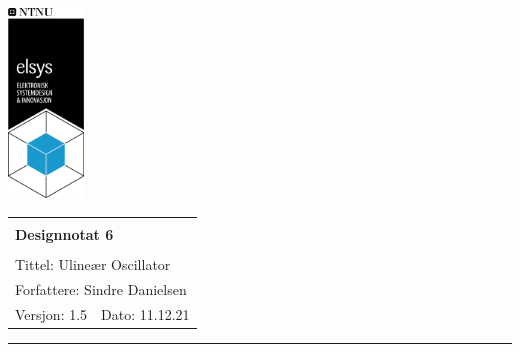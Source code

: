 \documentclass[a4paper,11pt,norsk]{article}
\begin{document}
\begin{minipage}[c]{0.15\textwidth}
\includegraphics[width=2.0cm]{elsys_pos_staaende_ntnu.png}
\end{minipage}
\begin{minipage}[c]{0.85\textwidth}

\renewcommand{\arraystretch}{1.7}
\large 
\begin{tabularx}{\textwidth}{|X|X|}
\hline
\multicolumn{2}{|l|}{} \\
\multicolumn{2}{|l|}{\huge \textbf{Designnotat 6}} \\
\multicolumn{2}{|l|}{}  \\
\hline
\multicolumn{2}{|l|}{Tittel: 
Ulineær Oscillator
} \\
\hline
\multicolumn{2}{|l|}{Forfattere: 
Sindre Danielsen
} \\
\hline
Versjon: 1.5 & Dato: 11.12.21
\\
\hline 
\end{tabularx}
\end{minipage}
\normalsize


\setlength{\parskip}{0ex}
\renewcommand{\baselinestretch}{0.1}\normalsize
\tableofcontents
\renewcommand{\baselinestretch}{1.00}\normalsize
\setlength{\parskip}{2ex}
\rule{\textwidth}{1pt}

\newpage
\end{document}
